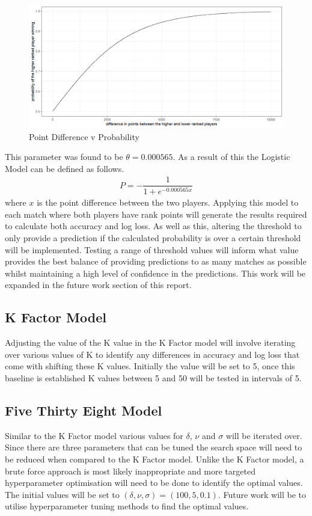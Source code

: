 \documentclass[12pt,a4paper]{article}
\begin{document}
\begin{figure}[H]
  \centering
  \includegraphics[scale=0.6]{images/logistic_curve.png}
  \caption{Point Difference v Probability}
  \label{fig:logisticcurve}
\end{figure}
This parameter was found to be $\theta = 0.000565$. As a
result of this the Logistic Model can be defined as follows.
\begin{gather}
  P = -\dfrac{1}{1+e^{-0.000565x}}
\end{gather}
where $x$ is the point difference between the two players. Applying this model
to each match where both players have rank points will generate the results
required to calculate both accuracy and log loss. As well as this,
altering the threshold to only provide a prediction if the calculated probability
is over a certain threshold will be implemented. Testing a range of threshold
values will inform what value provides the best balance of providing predictions
to as many matches as possible whilst maintaining a high level of confidence in the
predictions. This work will be expanded in the future work section of this report.

\subsection{K Factor Model}
Adjusting the value of the K value in the K Factor model will involve iterating
over various values of K to identify any differences in accuracy and log loss
that come with shifting these K values. Initially the value will be set to 5,
once this baseline is established K values between 5 and 50 will be tested in
intervals of 5.

\subsection{Five Thirty Eight Model}
Similar to the K Factor model various values for $\delta$, $\nu$ and $\sigma$
will be iterated over. Since there are three parameters that can be tuned
the search space will need to be reduced when compared to the K Factor model.
Unlike the K Factor model, a brute force approach is most likely inappropriate
and more targeted hyperparameter optimisation will need to be done to identify
the optimal values.
The initial values will be set to $(\delta,\nu,\sigma) = (100,5,0.1)$. Future
work will be to utilise hyperparameter tuning methods to find the optimal values.
\end{document}
